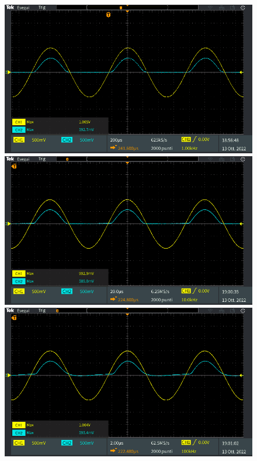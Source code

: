 \begin{figure}[!ht]
	\centering
	\begin{minipage}{.496\textwidth}
		\includegraphics[width=\linewidth]{./ImageFiles/Laboratorio 2/TEK00011.PNG}
	\end{minipage}
	\begin{minipage}{.496\textwidth}
		\includegraphics[width=\linewidth]{./ImageFiles/Laboratorio 2/TEK00012.PNG}
	\end{minipage}
	\begin{minipage}{.496\textwidth}
		\includegraphics[width=\linewidth]{./ImageFiles/Laboratorio 2/TEK00013.PNG}

\end{minipage}
\end{figure}
